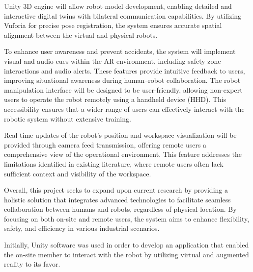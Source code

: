 Unity 3D engine will allow robot model development, enabling detailed and interactive digital twins with bilateral communication capabilities. By utilizing Vuforia for precise pose registration, the system ensures accurate spatial alignment between the virtual and physical robots.

To enhance user awareness and prevent accidents, the system will implement visual and audio cues within the \ac{AR} environment, including safety-zone interactions and audio alerts. These features provide intuitive feedback to users, improving situational awareness during human--robot collaboration. The robot manipulation interface will be designed to be user-friendly, allowing non-expert users to operate the robot remotely using a handheld device (\ac{HHD}). This accessibility ensures that a wider range of users can effectively interact with the robotic system without extensive training.

Real-time updates of the robot's position and workspace visualization will be provided through camera feed transmission, offering remote users a comprehensive view of the operational environment. This feature addresses the limitations identified in existing literature, where remote users often lack sufficient context and visibility of the workspace.


Overall, this project seeks to expand upon current research by providing a holistic solution that integrates advanced technologies to facilitate seamless collaboration between humans and robots, regardless of physical location. By focusing on both on-site and remote users, the system aims to enhance flexibility, safety, and efficiency in various industrial scenarios.




Initially, Unity software was used in order to develop an application that enabled the on-site member to interact with the robot by utilizing 
virtual and augmented reality to its favor.  


